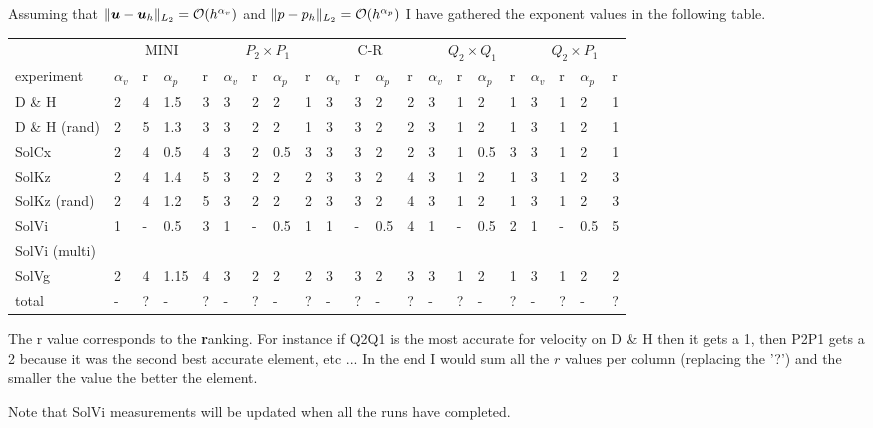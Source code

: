 \newpage




Assuming that $
\| {\bm u} - {\bm u}_h \|_{L_2} = {\cal O}(h^{\alpha_v})
$ and $
\| p - p_h \|_{L_2} = {\cal O}(h^{\alpha_p})
$
I have gathered the exponent values in the following 
table. 


\begin{tabular}{|l|llll|llll|llll|llll|llll|}
\hline
& 
\multicolumn{4}{c|}{MINI}&  
\multicolumn{4}{c|}{$P_2\times P_1$}  & 
\multicolumn{4}{c|}{C-R}  & 
\multicolumn{4}{c|}{$Q_2\times Q_1$} &  
\multicolumn{4}{c|}{$Q_2\times P_1$}  \\
experiment      & 
$\alpha_v$ & r  &  $\alpha_p$ & r &  
$\alpha_v$ & r  &  $\alpha_p$ & r &  
$\alpha_v$ & r  &  $\alpha_p$ & r &  
$\alpha_v$ & r  & $\alpha_p$ & r &   
$\alpha_v$ & r  & $\alpha_p$ & r \\
\hline
\hline
D \& H 
&{2}&4&1.5&3
&{3}&2&2&1
&{3}&3&2&2
&{3}&1&2&1
&{3}&1&2&1\\
D \& H (rand)
&2&5&1.3&3
&3&2&2&1
&3&3&2&2
&3&1&2&1
&3&1&2&1 \\
SolCx 
&2&4&0.5&4
&3&2&0.5&3
&3&3&2&2
&3&1&0.5&3
&3&1&2&1\\
SolKz 
&2&4&1.4&5
&3&2&2&2
&3&3&2&4
&3&1&2&1
&3&1&2&3\\
SolKz (rand)
&2&4&1.2&5
&3&2&2&2
&3&3&2&4
&3&1&2&1
&3&1&2&3\\
SolVi 
&1&-&0.5&3
&1&-&0.5&1
&1&-&0.5&4
&1&-&0.5&2
&1&-&0.5&5\\
SolVi (multi) \\ 
SolVg &
2&4&1.15&4&
3&2&2&2&
3&3&2&3&
3&1&2&1&
3&1&2&2\\
\hline
total  
&-&?&-&?
&-&?&-&?
&-&?&-&?
&-&?&-&?
&-&?&-&?\\
\hline
\end{tabular}

The r value corresponds to the \textbf{r}anking. For instance if Q2Q1 is the most accurate for velocity on D \& H then it gets a 1, then P2P1 gets a 2 because it was the second best accurate element, etc ...
In the end I would sum all the $r$ values per column (replacing the '?') 
and the smaller the value the better the element. 

Note that SolVi measurements will be updated when all the runs have completed.  







